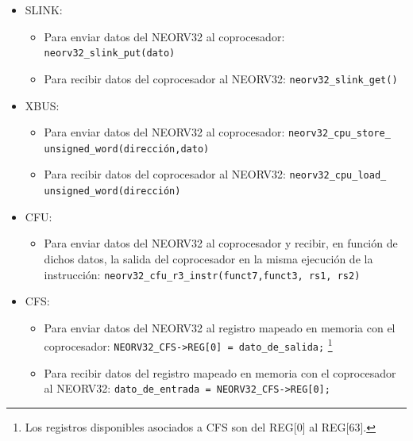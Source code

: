 \begin{itemize}
    \item SLINK:
        \begin{itemize}
            \item Para enviar datos del NEORV32 al coprocesador: \texttt{neorv32_slink_put(dato)} 
            \item Para recibir datos del coprocesador al NEORV32: \texttt{neorv32_slink_get()} 
        \end{itemize}
    \item XBUS:
        \begin{itemize}
            \item Para enviar datos del NEORV32 al coprocesador: \texttt{neorv32_cpu_store_}    \texttt{unsigned_word(dirección,dato)} 
            \item Para recibir datos del coprocesador al NEORV32: \texttt{neorv32_cpu_load_}   \texttt{unsigned_word(dirección)} 
        \end{itemize}
    \item CFU:
        \begin{itemize}
            \item Para enviar datos del NEORV32 al coprocesador y recibir, en función de dichos datos, la salida del coprocesador en la misma ejecución de la instrucción: \texttt{neorv32_cfu_r3_instr(funct7,funct3, rs1, rs2)} 
        \end{itemize}
    \item CFS:
        \begin{itemize}
            \item Para enviar datos del NEORV32 al registro mapeado en memoria con el coprocesador: \texttt{NEORV32_CFS->REG[0] = dato_de_salida;} \footnote{Los registros disponibles asociados a CFS son del REG[0] al REG[63].}
            \item Para recibir datos del registro mapeado en memoria con el coprocesador al NEORV32: \texttt{dato_de_entrada = NEORV32_CFS->REG[0];} 
        \end{itemize}
\end{itemize}

